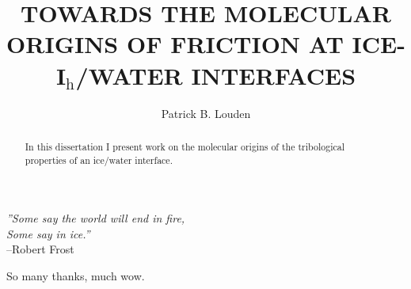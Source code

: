 \documentclass[noinfo,final,sort&compress]{nddiss2e}
\begin{document}
\frontmatter %

\title{TOWARDS THE MOLECULAR ORIGINS OF FRICTION AT
  ICE-I$_\mathrm{h}$/WATER INTERFACES}
\author{Patrick B. Louden}
\maketitle

\makecopyright

\begin{abstract}
In this dissertation I present work on the molecular origins of the
tribological properties of an ice/water interface. 
\end{abstract}


\tableofcontents
\listoffigures
\listoftables

\begin{preface}
\vfill
\begin{flushright}
\textit{''Some say the world will end in fire,} \\
\textit{Some say in ice.''}\\
--Robert Frost
\end{flushright}
\vfill
\end{preface}

\begin{acknowledge}
So many thanks, much wow.
\end{acknowledge}

\mainmatter




\end{document}
